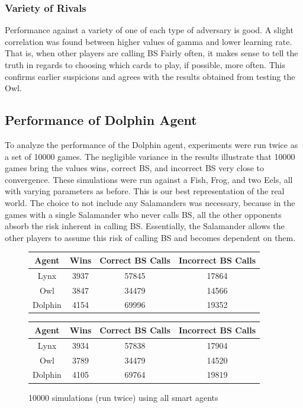 \documentclass[a4paper,11pt]{article}
\begin{document}
\subsubsection{Variety of Rivals}


Performance against a variety of one of each type of adversary is good. A slight correlation was found between higher values of gamma and lower learning rate. That is, when other players are calling BS Fairly often, it makes sense to tell the truth in regards to choosing which cards to play, if possible, 
more often. This confirms earlier suspicions and agrees with the results obtained from testing the Owl. 

\subsection{Performance of Dolphin Agent}



To analyze the performance of the Dolphin agent, experiments were run twice as a set of 10000 games. The negligible variance in the results illustrate that 10000 games bring the values wins, correct BS, and incorrect BS very close to convergence.
These simulations were run against a Fish, Frog, and two Eels, all with varying parameters as before. This is our best representation of the real world. The choice to not include any Salamanders was necessary, because in the games with a single 
Salamander who never calls BS, all the other opponents absorb the risk inherent in calling BS. Essentially, the Salamander allows the other players to assume this risk of calling BS and becomes dependent on them.

\begin{figure}[h]
\begin{center}
    \begin{tabular}{| c | c | c | c |}
    \hline
    Agent & Wins & Correct BS Calls & Incorrect BS Calls\\
\hline
	Lynx & 3937 & 57845 & 17864 \\
	Owl & 3847 & 34479 & 14566 \\
	Dolphin & 4154 & 69996 & 19352 \\
    \hline
    \end{tabular}
\end{center}

\begin{center}
    \begin{tabular}{| c | c | c | c |}
    \hline
    Agent & Wins & Correct BS Calls & Incorrect BS Calls\\
\hline
	Lynx & 3934 & 57838 & 17904 \\
	Owl & 3789 & 34479 & 14520 \\
	Dolphin & 4105 & 69764 & 19819 \\
    \hline
    \end{tabular}
\end{center}
\caption{10000 simulations (run twice) using all smart agents}

\end{figure}
\end{document}
